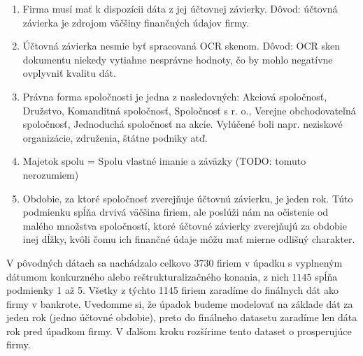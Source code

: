 \begin{enumerate}
    \item Firma musí mať k dispozícii dáta z jej účtovnej závierky. Dôvod: účtovná závierka je zdrojom väčšiny finančných údajov firmy.
    \item Účtovná závierka nesmie byť spracovaná OCR skenom. Dôvod: OCR sken dokumentu niekedy vytiahne nesprávne hodnoty, čo by mohlo negatívne ovplyvniť kvalitu dát.
    \item Právna forma spoločnosti je jedna z nasledovných: Akciová spoločnosť, Družstvo, Komanditná spoločnosť, Spoločnosť s r. o., Verejne obchodovateľná spoločnosť, Jednoduchá spoločnosť na akcie. Vylúčené boli napr. neziskové organizácie, združenia, štátne podniky atď.
    \item Majetok spolu = Spolu vlastné imanie a záväzky (TODO: tomuto nerozumiem)
    \item Obdobie, za ktoré spoločnosť zverejňuje účtovnú závierku, je jeden rok. Túto podmienku spĺňa drvivá väčšina firiem, ale poslúži nám na očistenie od malého množstva spoločností, ktoré účtovné závierky zverejňujú za obdobie inej dĺžky, kvôli čomu ich finančné údaje môžu mať mierne odlišný charakter.
\end{enumerate}

V pôvodných dátach sa nachádzalo celkovo \(3730\) firiem v úpadku s vyplneným dátumom konkurzného alebo reštrukturalizačného konania, z nich \(1145\) spĺňa podmienky 1 až 5.
Všetky z týchto 1145 firiem zaradíme do finálnych dát ako firmy v bankrote.
Uvedomme si, že úpadok budeme modelovať na základe dát za jeden rok (jedno účtovné obdobie), preto do finálneho datasetu zaradíme len dáta rok pred úpadkom firmy.
V ďalšom kroku rozšírime tento dataset o prosperujúce firmy.

